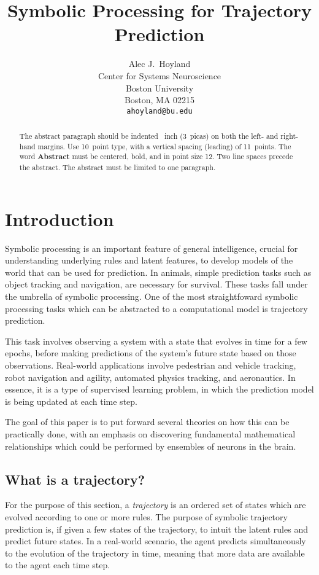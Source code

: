 \documentclass{article}
\title{Symbolic Processing for Trajectory Prediction}
\author{%
  Alec J.~Hoyland \\
  Center for Systems Neuroscience\\
  Boston University\\
  Boston, MA 02215 \\
  \texttt{ahoyland@bu.edu} \\
}
\begin{document}
\maketitle

\begin{abstract}
  The abstract paragraph should be indented ~inch (3~picas) on
  both the left- and right-hand margins. Use 10~point type, with a vertical
  spacing (leading) of 11~points.  The word \textbf{Abstract} must be centered,
  bold, and in point size 12. Two line spaces precede the abstract. The abstract
  must be limited to one paragraph.
\end{abstract}

\section{Introduction}

Symbolic processing is an important feature of general intelligence,
crucial for understanding underlying rules and latent features,
to develop models of the world that can be used for prediction.
In animals, simple prediction tasks such as object tracking and navigation,
are necessary for survival.
These tasks fall under the umbrella of symbolic processing.
One of the most straightfoward symbolic processing tasks
which can be abstracted to a computational model is trajectory prediction.

This task involves observing a system with a state that evolves in time
for a few epochs, before making predictions of the system's future state
based on those observations.
Real-world applications involve pedestrian and vehicle tracking,
robot navigation and agility, automated physics tracking,
and aeronautics.
In essence, it is a type of supervised learning problem,
in which the prediction model is being updated at each time step.

The goal of this paper is to put forward several theories on how this can be practically done,
with an emphasis on discovering fundamental mathematical relationships
which could be performed by ensembles of neurons in the brain.

\subsection{What is a trajectory?}

For the purpose of this section, a \textit{trajectory} is an ordered set of states
which are evolved according to one or more rules.
The purpose of symbolic trajectory prediction is, if given a few states of the trajectory,
to intuit the latent rules and predict future states.
In a real-world scenario, the agent predicts simultaneously to the evolution of the trajectory in time,
meaning that more data are available to the agent each time step.
\end{document}
